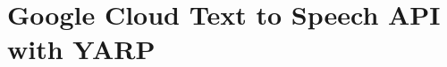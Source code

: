 \chapter{Google Cloud Text to Speech API with YARP}
\label{md__2home_2runner_2work_2speech_2speech_2gh-pages_2speechInteraction_2modules_2googleSynthesis_2README}
